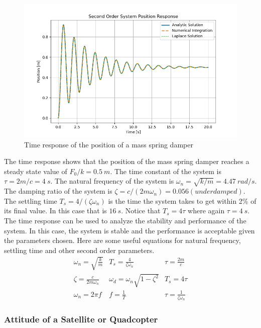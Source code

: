 \begin{figure}[H]
\centering
\includegraphics[width=0.8\linewidth]{Figures/mass_spring_damper_response.png}
\caption{Time response of the position of a mass spring damper}
\label{f:mass_spring_damper_response}
\end{figure}
\noindent The time response shows that the position of the mass spring damper reaches a steady state value of $F_0/k = 0.5~m$. The time constant of the system is $\tau = 2m/c = 4~s$. The natural frequency of the system is $\omega_n = \sqrt{k/m} = 4.47~rad/s$. The damping ratio of the system is $\zeta = c/(2 m\omega_n) = 0.056 (underdamped)$. The settling time $T_s=4/(\zeta \omega_n)$ is the time the system takes to get within 2\% of its final value. In this case that is $16~s$. Notice that $T_s=4\tau$ where again $\tau = 4~s$. The time response can be used to analyze the stability and performance of the system. In this case, the system is stable and the performance is acceptable given the parameters chosen. Here are some useful equations for natural frequency, settling time and other second order parameters.
\begin{equation}
    \begin{matrix}
    \omega_n = \sqrt{\frac{k}{m}} & T_s = \frac{4}{\zeta \omega_n} & \tau = \frac{2m}{c} \\
    \zeta = \frac{c}{2m\omega_n} & \omega_d = \omega_n \sqrt{1-\zeta^2} & T_s = 4\tau \\
    \omega_n = 2\pi f & f = \frac{1}{T} & \tau = \frac{1}{\zeta \omega_n} 
    \end{matrix}
\end{equation}

\subsubsection{Attitude of a Satellite or Quadcopter}

